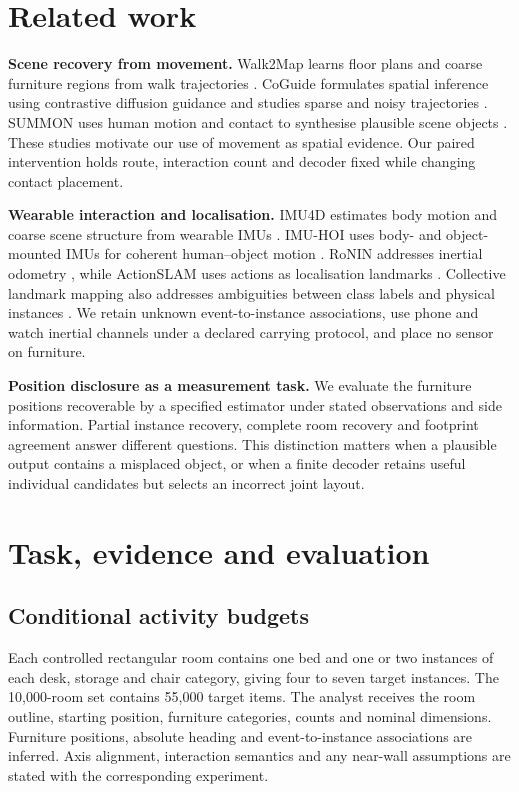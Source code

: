 \documentclass[10pt,twocolumn,letterpaper]{article}
\begin{document}
\section{Related work}\label{related-work}

\textbf{Scene recovery from movement.} Walk2Map learns floor plans and
coarse furniture regions from walk trajectories \cite{r1}. CoGuide
formulates spatial inference using contrastive diffusion guidance and
studies sparse and noisy trajectories \cite{r2}. SUMMON uses human
motion and contact to synthesise plausible scene objects \cite{r3}.
These studies motivate our use of movement as spatial evidence. Our
paired intervention holds route, interaction count and decoder fixed
while changing contact placement.

\textbf{Wearable interaction and localisation.} IMU4D estimates body
motion and coarse scene structure from wearable IMUs \cite{r4}. IMU-HOI
uses body- and object-mounted IMUs for coherent human--object motion
\cite{r12}. RoNIN addresses inertial odometry \cite{r6}, while
ActionSLAM uses actions as localisation landmarks \cite{r5}. Collective
landmark mapping also addresses ambiguities between class labels and
physical instances \cite{r13}. We retain unknown event-to-instance
associations, use phone and watch inertial channels under a declared
carrying protocol, and place no sensor on furniture.

\textbf{Position disclosure as a measurement task.} We evaluate the
furniture positions recoverable by a specified estimator under stated
observations and side information. Partial instance recovery, complete
room recovery and footprint agreement answer different questions. This
distinction matters when a plausible output contains a misplaced object,
or when a finite decoder retains useful individual candidates but
selects an incorrect joint layout.

\section{Task, evidence and
evaluation}\label{task-evidence-and-evaluation}

\subsection{Conditional activity
budgets}\label{conditional-activity-budgets}

Each controlled rectangular room contains one bed and one or two
instances of each desk, storage and chair category, giving four to seven
target instances. The 10,000-room set contains 55,000 target items. The
analyst receives the room outline, starting position, furniture
categories, counts and nominal dimensions. Furniture positions, absolute
heading and event-to-instance associations are inferred. Axis alignment,
interaction semantics and any near-wall assumptions are stated with the
corresponding experiment.
\end{document}

